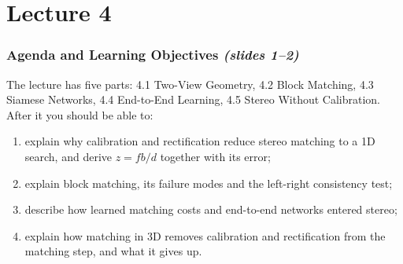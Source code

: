 \documentclass[11pt,a4paper]{article}
\newcommand{\slr}[1]{\texorpdfstring{\emph{(slides #1)}}{(slides #1)}}
\theoremstyle{definition}
\theoremstyle{plain}
\theoremstyle{remark}
\begin{document}
\newpage

\setcounter{section}{0}
\renewcommand{\thesection}{\arabic{section}}
\part{Lecture 4}

\begin{abstract}\noindent
These notes follow the slide deck \emph{04 Stereo Depth Estimation} (60 slides) section by section; every header carries its slide range. Formal statements (definitions, lemmas, proofs) are merged in where the slides introduce a topic, and blue \emph{Intuition} boxes explain the ``why'' in plain words.
\textbf{Source note:} only the slide deck was uploaded, no companion chapter. The formal content therefore comes from standard references that the slides themselves cite (Hartley--Zisserman / Szeliski for geometry) and from the papers named on the slides (Zbontar--LeCun, Mayer et al., Kendall et al., Wang et al., Leroy et al.). Where a statement goes beyond what the slides say, it is marked as such.
Diagrams are redrawn in TikZ; photographs are left as dashed placeholders that name the slide to copy from.
\end{abstract}


\newpage

\section*{Agenda and Learning Objectives \slr{1--2}}
The lecture has five parts: 4.1 Two-View Geometry, 4.2 Block Matching, 4.3 Siamese Networks, 4.4 End-to-End Learning, 4.5 Stereo Without Calibration. After it you should be able to:
\begin{enumerate}
\item explain why calibration and rectification reduce stereo matching to a 1D search, and derive $z=fb/d$ together with its error;
\item explain block matching, its failure modes and the left-right consistency test;
\item describe how learned matching costs and end-to-end networks entered stereo;
\item explain how matching in 3D removes calibration and rectification from the matching step, and what it gives up.
\end{enumerate}
\end{document}
